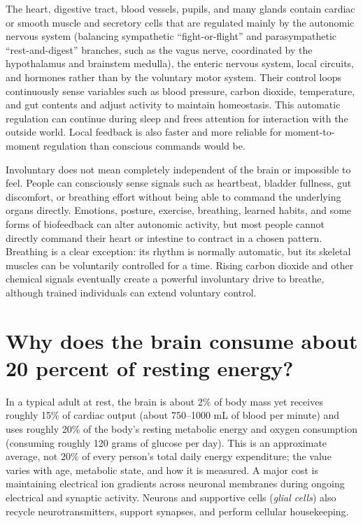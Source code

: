 \documentclass[11pt,oneside]{report}
\begin{document}
The heart, digestive tract, blood vessels, pupils, and many glands contain
cardiac or smooth muscle and secretory cells that are regulated mainly by the
autonomic nervous system (balancing sympathetic ``fight-or-flight'' and
parasympathetic ``rest-and-digest'' branches, such as the vagus nerve,
coordinated by the hypothalamus and brainstem medulla), the enteric nervous
system, local circuits, and hormones rather than by the voluntary motor system. Their control loops
continuously sense variables such
as blood pressure, carbon dioxide, temperature, and gut contents and adjust
activity to maintain homeostasis. This automatic regulation can continue during
sleep and frees attention for interaction with the outside world. Local
feedback is also faster and more reliable for moment-to-moment regulation than
conscious commands would be.

Involuntary does not mean completely independent of the brain or impossible to
feel. People can consciously sense signals such as heartbeat, bladder fullness,
gut discomfort, or breathing effort without being able to command the underlying
organs directly. Emotions, posture, exercise, breathing, learned habits, and some
forms of biofeedback can alter autonomic activity, but most people cannot
directly command their heart or intestine to contract in a chosen pattern.
Breathing is a clear exception: its rhythm is normally automatic, but its
skeletal muscles can be voluntarily controlled for a time. Rising carbon
dioxide and other chemical signals eventually create a powerful involuntary
drive to breathe, although trained individuals can extend voluntary control.

\section{Why does the brain consume about 20 percent of resting energy?}

In a typical adult at rest, the brain is about 2\% of body mass yet receives
roughly 15\% of cardiac output (about 750--1000 mL of blood per minute) and uses
roughly 20\% of the body's resting metabolic energy and oxygen consumption
(consuming roughly 120 grams of glucose per day). This is an
approximate average, not 20\% of every person's total daily energy expenditure;
the value varies with age, metabolic state, and how it is measured. A major cost
is maintaining electrical ion gradients across neuronal membranes during ongoing
electrical and synaptic activity. Neurons and supportive cells (\emph{glial
cells}) also recycle neurotransmitters, support synapses, and perform cellular
housekeeping.
\end{document}
